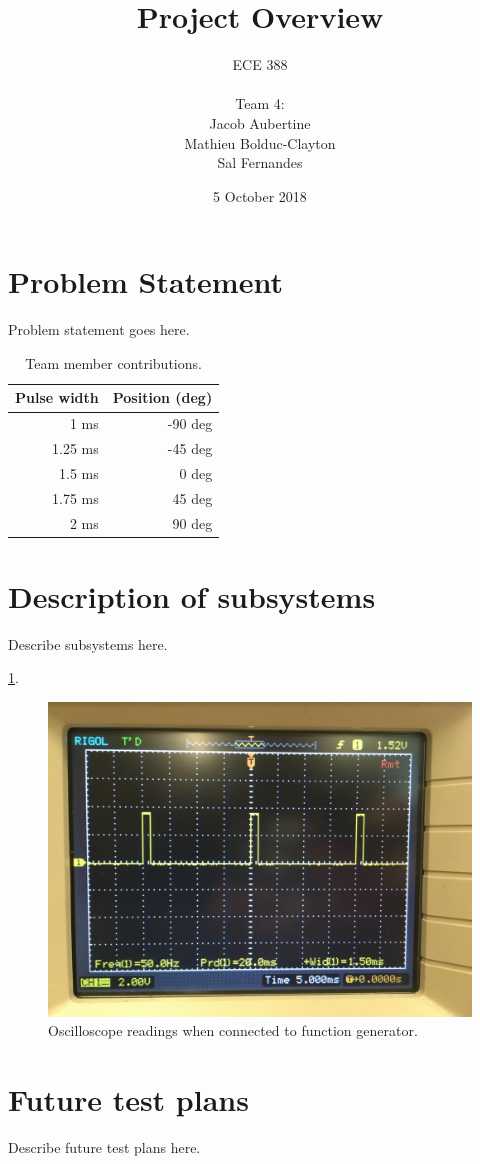 \documentclass{article}
\title{Project Overview}
\date{5 October 2018}
\author{
	ECE 388
	\\
	\\
	Team 4:
	\\
	Jacob Aubertine
	\\
	Mathieu Bolduc-Clayton
	\\
	Sal Fernandes
}
\begin{document}
	\maketitle
	\newpage
	\tableofcontents
	\newpage

	\section{Problem Statement}
	Problem statement goes here.

	\begin{table}[h!]
  		\begin{center}
    			\caption{Team member contributions.}
    			\label{tab:table1}
    			\begin{tabular}{r|r}
      				\textbf{Pulse width} & \textbf{Position (deg)} \\
				\hline
      				1 ms& -90 deg\\
      				1.25 ms & -45 deg\\
      				1.5 ms & 0 deg\\
      				1.75 ms & 45 deg\\
				2 ms& 90 deg\\
   			 \end{tabular}
  		\end{center}
	\end{table}

	\section{Description of subsystems}
	Describe subsystems here.
	
	\ref{fig:oscilloscope}.

	\begin{figure}[h!]
		\includegraphics[width=\linewidth]{oscilloscope.png}
		\caption{Oscilloscope readings when connected to function generator.}
		\label{fig:oscilloscope}
	\end{figure}
	
	\section{Future test plans}
	Describe future test plans here.
\end{document}
